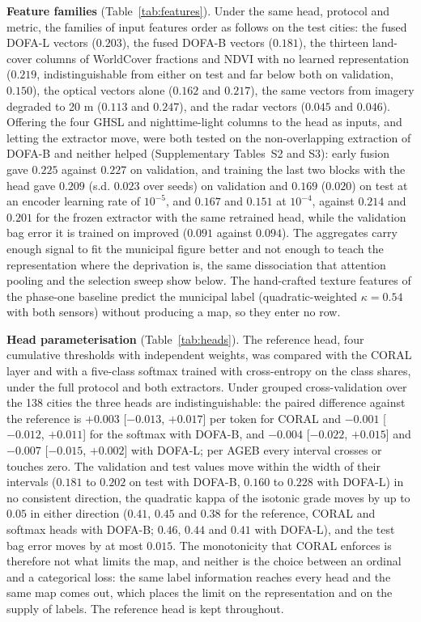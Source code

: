 \documentclass[11pt]{article}
\begin{document}
\textbf{Feature families} (Table~\ref{tab:features}). Under the same head, protocol and
metric, the families of input features order as follows on the test cities: the fused
DOFA-L vectors ($0.203$), the fused DOFA-B vectors ($0.181$), the thirteen land-cover
columns of WorldCover fractions and NDVI with no learned representation ($0.219$,
indistinguishable from either on test and far below both on validation, $0.150$), the
optical vectors alone ($0.162$ and $0.217$), the same vectors from imagery degraded to
20 m ($0.113$ and $0.247$), and the radar vectors ($0.045$ and $0.046$). Offering the
four GHSL and nighttime-light columns to the head as inputs, and letting the extractor
move, were both tested on the non-overlapping extraction of DOFA-B and neither helped
(Supplementary Tables~S2 and S3): early fusion gave $0.225$ against $0.227$ on
validation, and training the last two blocks with the head gave $0.209$ (s.d. $0.023$
over seeds) on validation and $0.169$ ($0.020$) on test at an encoder learning rate of
$10^{-5}$, and $0.167$ and $0.151$ at $10^{-4}$, against $0.214$ and $0.201$ for the
frozen extractor with the same retrained head, while the validation bag error it is
trained on improved ($0.091$ against $0.094$). The
aggregates carry enough signal to fit the municipal figure better and not enough to
teach the representation where the deprivation is, the same dissociation that attention
pooling and the selection sweep show below. The hand-crafted texture features of the
phase-one baseline predict the municipal label (quadratic-weighted $\kappa = 0.54$ with
both sensors) without producing a map, so they enter no row.



\textbf{Head parameterisation} (Table~\ref{tab:heads}). The reference head, four
cumulative thresholds with independent weights, was compared with the CORAL layer and
with a five-class softmax trained with cross-entropy on the class shares, under the full
protocol and both extractors. Under grouped cross-validation over the 138 cities the
three heads are indistinguishable: the paired difference against the reference is
$+0.003$ [$-0.013$, $+0.017$] per token for CORAL and $-0.001$ [$-0.012$, $+0.011$] for
the softmax with DOFA-B, and $-0.004$ [$-0.022$, $+0.015$] and $-0.007$ [$-0.015$,
$+0.002$] with DOFA-L; per AGEB every interval crosses or touches zero. The validation
and test values move within the width of their intervals ($0.181$ to $0.202$ on test
with DOFA-B, $0.160$ to $0.228$ with DOFA-L) in no consistent direction, the quadratic
kappa of the isotonic grade moves by up to $0.05$ in either direction ($0.41$, $0.45$
and $0.38$ for the reference, CORAL and softmax heads with DOFA-B; $0.46$, $0.44$ and
$0.41$ with DOFA-L), and the test bag error moves by at most $0.015$. The
monotonicity that CORAL enforces is therefore not what limits the map, and neither is
the choice between an ordinal and a categorical loss: the same label information reaches
every head and the same map comes out, which places the limit on the representation and
on the supply of labels. The reference head is kept throughout.
\end{document}

